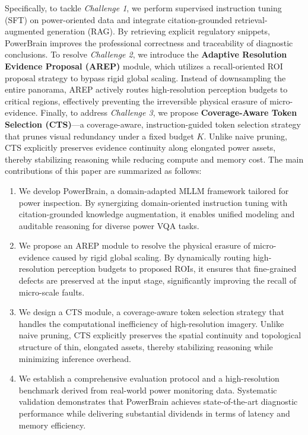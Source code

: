 \documentclass[journal,twoside,web]{ieeecolor}
\begin{document}
Specifically, to tackle \textit{Challenge 1}, we perform supervised instruction tuning (SFT) on power-oriented data and integrate citation-grounded retrieval-augmented generation (RAG). By retrieving explicit regulatory snippets, PowerBrain improves the professional correctness and traceability of diagnostic conclusions.
To resolve \textit{Challenge 2}, we introduce the \textbf{Adaptive Resolution Evidence Proposal (AREP)} module, which utilizes a recall-oriented ROI proposal strategy to bypass rigid global scaling. Instead of downsampling the entire panorama, AREP actively routes high-resolution perception budgets to critical regions, effectively preventing the irreversible physical erasure of micro-evidence.
Finally, to address \textit{Challenge 3}, we propose \textbf{Coverage-Aware Token Selection (CTS)}---a coverage-aware, instruction-guided token selection strategy that prunes visual redundancy under a fixed budget $K$. Unlike naive pruning, CTS explicitly preserves evidence continuity along elongated power assets, thereby stabilizing reasoning while reducing compute and memory cost.
The main contributions of this paper are summarized as follows:
\begin{enumerate}
  \item We develop PowerBrain, a domain-adapted MLLM framework tailored for power inspection. By synergizing domain-oriented instruction tuning with citation-grounded knowledge augmentation, it enables unified modeling and auditable reasoning for diverse power VQA tasks.

  \item We propose an AREP module to resolve the physical erasure of micro-evidence caused by rigid global scaling. By dynamically routing high-resolution perception budgets to proposed ROIs, it ensures that fine-grained defects are preserved at the input stage, significantly improving the recall of micro-scale faults.

  \item We design a CTS module, a coverage-aware token selection strategy that handles the computational inefficiency of high-resolution imagery. Unlike naive pruning, CTS explicitly preserves the spatial continuity and topological structure of thin, elongated assets, thereby stabilizing reasoning while minimizing inference overhead.

  \item We establish a comprehensive evaluation protocol and a high-resolution benchmark derived from real-world power monitoring data. Systematic validation demonstrates that PowerBrain achieves state-of-the-art diagnostic performance while delivering substantial dividends in terms of latency and memory efficiency.
\end{enumerate}
\end{document}
